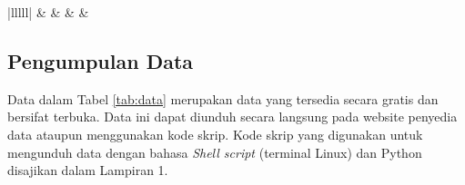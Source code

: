 \begin{spacing}{1.5}
\begin{table}[H]
{\begin{tabular}{|lllll|}
			 &  &  &                                                                & \cite{Lan2013}               \\ \hline
		\end{tabular}%
	}
	\end{table}
	\subsection[Pengumpulan Data]{Pengumpulan Data}
	Data dalam Tabel \ref{tab:data} merupakan data yang tersedia secara gratis dan bersifat terbuka. Data ini dapat diunduh secara langsung pada website penyedia data ataupun menggunakan kode skrip. Kode skrip yang digunakan untuk mengunduh data dengan bahasa \textit{Shell script} (terminal Linux) dan Python disajikan dalam Lampiran 1.
\end{spacing}
\vspace{-0.5pc}
